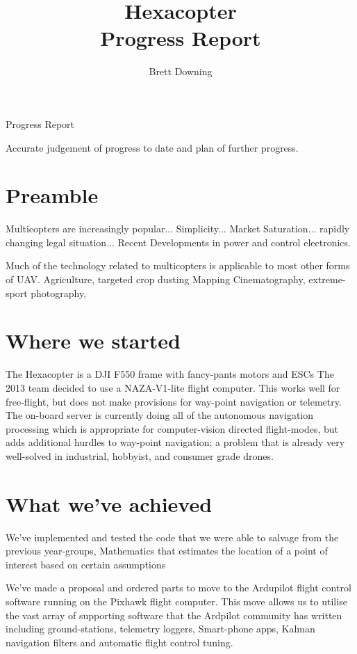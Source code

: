 \documentclass[11pt]{article}
\title{Hexacopter\\
	Progress Report}
\author{Brett Downing}
\date{}
\begin{document}
  \maketitle

  Progress Report
  
  Accurate judgement of progress to date and plan of further progress.

  \section{Preamble}
    Multicopters are increasingly popular... Simplicity... Market Saturation... rapidly changing legal situation... 
    Recent Developments in power and control electronics.

    Much of the technology related to multicopters is applicable to most other forms of UAV.
    Agriculture, targeted crop dusting
    Mapping
    Cinematography, extreme-sport photography, 


  \section{Where we started}
    The Hexacopter is a DJI F550 frame with fancy-pants motors and ESCs
    The 2013 team  decided to use a NAZA-V1-lite flight computer. This works well for free-flight, but does not make provisions for way-point navigation or telemetry.
    The on-board server is currently doing all of the autonomous navigation processing which is appropriate for computer-vision directed flight-modes, but adds additional  hurdles to way-point navigation; a problem that is already very well-solved in industrial, hobbyist, and consumer grade drones.



  \section{What we've achieved}
    We've implemented and tested the code that we were able to salvage from the previous year-groups,
    Mathematics that estimates the location of a point of interest based on certain assumptions

    We've made a proposal and ordered parts to move to the Ardupilot flight control software running on the Pixhawk flight computer.
    This move allows us to utilise the vast array of supporting software that the Ardpilot community has written including ground-stations, telemetry loggers, Smart-phone apps, Kalman navigation filters and automatic flight control tuning.
\end{document}
